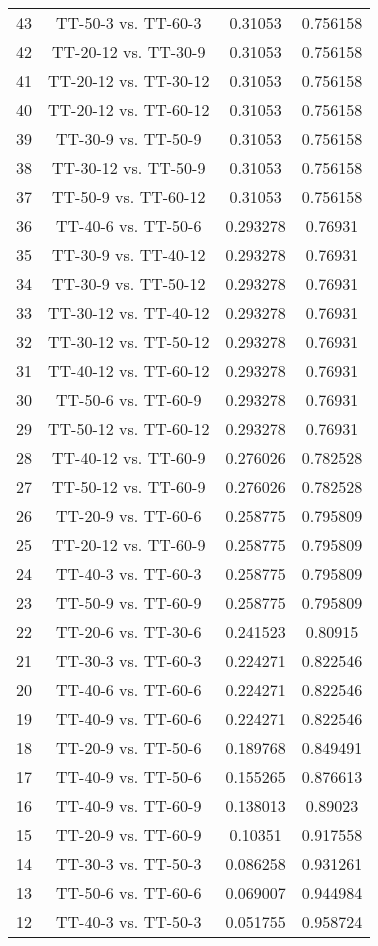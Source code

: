 \documentclass[a4paper,10pt]{article}
\begin{document}
\begin{landscape}
\begin{table}[!htp]
\begin{tabular}{cccc}
43&TT-50-3 vs. TT-60-3&0.31053&0.756158\\
42&TT-20-12 vs. TT-30-9&0.31053&0.756158\\
41&TT-20-12 vs. TT-30-12&0.31053&0.756158\\
40&TT-20-12 vs. TT-60-12&0.31053&0.756158\\
39&TT-30-9 vs. TT-50-9&0.31053&0.756158\\
38&TT-30-12 vs. TT-50-9&0.31053&0.756158\\
37&TT-50-9 vs. TT-60-12&0.31053&0.756158\\
36&TT-40-6 vs. TT-50-6&0.293278&0.76931\\
35&TT-30-9 vs. TT-40-12&0.293278&0.76931\\
34&TT-30-9 vs. TT-50-12&0.293278&0.76931\\
33&TT-30-12 vs. TT-40-12&0.293278&0.76931\\
32&TT-30-12 vs. TT-50-12&0.293278&0.76931\\
31&TT-40-12 vs. TT-60-12&0.293278&0.76931\\
30&TT-50-6 vs. TT-60-9&0.293278&0.76931\\
29&TT-50-12 vs. TT-60-12&0.293278&0.76931\\
28&TT-40-12 vs. TT-60-9&0.276026&0.782528\\
27&TT-50-12 vs. TT-60-9&0.276026&0.782528\\
26&TT-20-9 vs. TT-60-6&0.258775&0.795809\\
25&TT-20-12 vs. TT-60-9&0.258775&0.795809\\
24&TT-40-3 vs. TT-60-3&0.258775&0.795809\\
23&TT-50-9 vs. TT-60-9&0.258775&0.795809\\
22&TT-20-6 vs. TT-30-6&0.241523&0.80915\\
21&TT-30-3 vs. TT-60-3&0.224271&0.822546\\
20&TT-40-6 vs. TT-60-6&0.224271&0.822546\\
19&TT-40-9 vs. TT-60-6&0.224271&0.822546\\
18&TT-20-9 vs. TT-50-6&0.189768&0.849491\\
17&TT-40-9 vs. TT-50-6&0.155265&0.876613\\
16&TT-40-9 vs. TT-60-9&0.138013&0.89023\\
15&TT-20-9 vs. TT-60-9&0.10351&0.917558\\
14&TT-30-3 vs. TT-50-3&0.086258&0.931261\\
13&TT-50-6 vs. TT-60-6&0.069007&0.944984\\
12&TT-40-3 vs. TT-50-3&0.051755&0.958724\\

\end{tabular}
\end{table}
\end{landscape}
\end{document}

